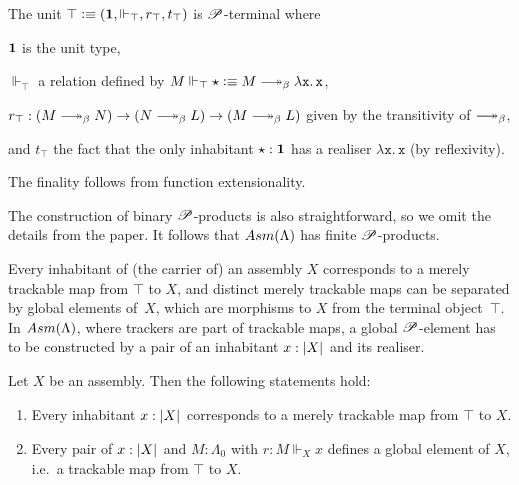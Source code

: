\documentclass[a4paper,UKenglish,numberwithinsect,cleveref,thm-restate,draft]{lipics-v2021}
\numberwithin{equation}{section}
\theoremstyle{definition}
\theoremstyle{plain}
\begin{document}
\begin{example}
  The unit $\top \vcentcolon\equiv (\mathbf{1}, \Vdash_\top, r_\top, t_\top)$ is $\mathscr{P}$-terminal where 
  \begin{romanenumerate}
    \item $\mathbf{1}$ is the unit type,  
    \item $\Vdash_\top$ a relation defined by $M \Vdash_\top \star \defeq M \reduce \mathtt{\lambda x.\, x}$, 
    \item $r_\top : (M \reduce N) \to (N \reduce L) \to (M \reduce L)$ given by the transitivity of $\reduce$,
    \item and $t_\top$ the fact that the only inhabitant $\star : \mathbf{1}$ has a realiser $\mathtt{\lambda x.\, x}$ (by reflexivity).
  \end{romanenumerate}
  The finality follows from function extensionality.
\end{example}
The construction of binary $\mathscr{P}$-products is also straightforward, so we omit the details from the paper.
It follows that $\Asm(\Lambda)$ has finite $\mathscr{P}$-products.

Every inhabitant of (the carrier of) an assembly $X$ corresponds to a merely trackable map from $\top$ to $X$, and distinct merely trackable maps can be separated by global elements of~$X$, which are morphisms to $X$ from the terminal object~$\top$.
In $\Asm(\Lambda)$, where trackers are part of trackable maps, a global $\mathscr{P}$-element has to be constructed by a pair of an inhabitant $x : \mathopen{}\left|X\right|_{}^{}\mathclose{}$ and its realiser.
\begin{lemma}\label{lem:global-element}
  Let $X$ be an assembly. Then the following statements hold:
  \begin{enumerate}
    \item Every inhabitant $x : \mathopen{}\left|X\right|_{}^{}\mathclose{}$ corresponds to a merely trackable map from $\top$ to $X$.
    \item Every pair of $x : \mathopen{}\left|X\right|_{}^{}\mathclose{}$ and $M : \Lambda_0$ with $r : M \Vdash_X x$ defines a global element of $X$, i.e.\ a trackable map from $\top$ to $X$.
  \end{enumerate}
\end{lemma}
\end{document}
